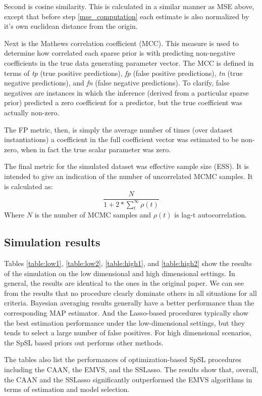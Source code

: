 Second is cosine similarity.
This is calculated in a similar manner as MSE above, except that before step \ref{mse_computation} each estimate is also normalized by it's own euclidean distance from the origin.

Next is the Mathews correlation coefficient (MCC).
This measure is used to determine how correlated each sparse prior is with predicting non-negative coefficients in the true data generating parameter vector.
The MCC is defined in terms of \textit{tp} (true positive predictions), \textit{fp} (false positive predictions), \textit{tn} (true negative predictions), and \textit{fn} (false negative predictions).
To clarify, false negatives are instances in which the inference (derived from a particular sparse prior) predicted a zero coefficient for a predictor, but the true coefficient was actually non-zero.

The FP metric, then, is simply the average number of times (over dataset instantiations) a coefficient in the full coefficient vector was estimated to be non-zero, when in fact the true scalar parameter was zero.

The final metric for the simulated dataset was effective sample size (ESS). 
It is intended to give an indication of the number of uncorrelated MCMC samples.
It is calculated as:
\begin{equation*}
    \frac{N}{1+2*\sum_t^\infty \rho(t)}
\end{equation*}
Where $N$ is the number of MCMC samples and $\rho(t)$ is lag-t autocorrelation.
\subsection{Simulation results}
\label{simulation_results}

Tables \ref{table:low1}, \ref{table:low2}, \ref{table:high1}, and \ref{table:high2} show the results of the simulation on the low dimensional and high dimensional settings. In general, the results are identical to the ones in the original paper. We can see from the results that no procedure clearly dominate others in all situations for all criteria. Bayesian averaging results generally have a better performance than the corresponding MAP estimator. And the Lasso-based procedures typically show the best estimation performance under the low-dimensional settings, but they tends to select a large number of false positives. For high dimensional scenarios, the SpSL based priors out performs other methods.

The tables also list the performances of optimization-based SpSL procedures including the CAAN, the EMVS, and the SSLasso. The results show that, overall, the CAAN and the SSLasso significantly outperformed the EMVS algorithms in terms of estimation and model selection.

